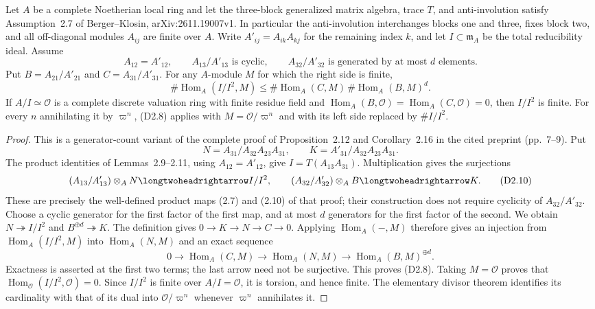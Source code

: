 \begin{lemma}
Let $A$ be a complete Noetherian local ring and let the
three-block generalized matrix algebra, trace $T$, and
anti-involution satisfy Assumption~2.7 of Berger--Klosin,
arXiv:2611.19007v1.  In particular the anti-involution
interchanges blocks one and three, fixes block two, and all
off-diagonal modules $A_{ij}$ are finite over $A$.
Write $A'_{ij}=A_{ik}A_{kj}$ for the remaining index $k$, and
let $I\subset\mathfrak m_A$ be the total reducibility ideal.
Assume
\[
 A_{12}=A'_{12},\qquad
 A_{13}/A'_{13}\text{ is cyclic},\qquad
 A_{32}/A'_{32}\text{ is generated by at most }d\text{ elements}.
                                                               \tag{D2.7}
\]
Put $B=A_{21}/A'_{21}$ and $C=A_{31}/A'_{31}$.
For any $A$-module $M$ for which the right side is finite,
\[
 \#\operatorname{Hom}_A(I/I^2,M)
 \leq\#\operatorname{Hom}_A(C,M)\,
       \#\operatorname{Hom}_A(B,M)^d.                         \tag{D2.8}
\]
If $A/I\simeq\mathcal O$ is a complete discrete valuation
ring with finite residue field and
$\operatorname{Hom}_A(B,\mathcal O)=
 \operatorname{Hom}_A(C,\mathcal O)=0$, then $I/I^2$ is finite.
For every $n$ annihilating it by $\varpi^n$, (D2.8) applies
with $M=\mathcal O/\varpi^n$ and with its left side replaced
by $\#I/I^2$.
\end{lemma}

\begin{proof}
This is a generator-count variant of the complete proof of
Proposition~2.12 and Corollary~2.16 in the cited preprint
(pp.~7--9).  Put
\[
 N=A_{31}/A_{32}A_{23}A_{31},\qquad
 K=A'_{31}/A_{32}A_{23}A_{31}.                                \tag{D2.9}
\]
The product identities of Lemmas~2.9--2.11, using
$A_{12}=A'_{12}$, give $I=T(A_{13}A_{31})$.
Multiplication gives the surjections
\[
 (A_{13}/A'_{13})\otimes_A N\longtwoheadrightarrow I/I^2,
 \qquad
 (A_{32}/A'_{32})\otimes_A B\longtwoheadrightarrow K.          \tag{D2.10}
\]
These are precisely the well-defined product maps (2.7) and
(2.10) of that proof; their construction does not require
cyclicity of $A_{32}/A'_{32}$.
Choose a cyclic generator for the first factor of the first
map, and at most $d$ generators for the first factor of the
second.  We obtain $N\twoheadrightarrow I/I^2$ and
$B^{\oplus d}\twoheadrightarrow K$.
The definition gives $0\to K\to N\to C\to0$.
Applying $\operatorname{Hom}_A(-,M)$ therefore gives an
injection from $\operatorname{Hom}_A(I/I^2,M)$ into
$\operatorname{Hom}_A(N,M)$ and an exact sequence
\[
 0\longrightarrow\operatorname{Hom}_A(C,M)
 \longrightarrow\operatorname{Hom}_A(N,M)
 \longrightarrow\operatorname{Hom}_A(B,M)^{\oplus d}.          \tag{D2.11}
\]
Exactness is asserted at the first two terms; the last arrow
need not be surjective.  This proves (D2.8).
Taking $M=\mathcal O$ proves that
$\operatorname{Hom}_{\mathcal O}(I/I^2,\mathcal O)=0$.
Since $I/I^2$ is finite over $A/I=\mathcal O$, it is torsion,
and hence finite.  The elementary divisor theorem identifies
its cardinality with that of its dual into
$\mathcal O/\varpi^n$ whenever $\varpi^n$ annihilates it.
\end{proof}

